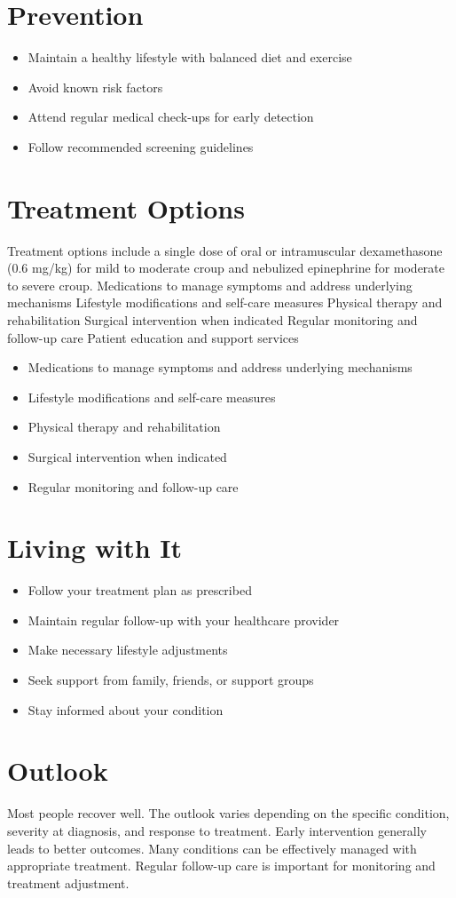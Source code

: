 \section{Prevention}
\begin{itemize}[noitemsep]
  \item Maintain a healthy lifestyle with balanced diet and exercise
  \item Avoid known risk factors
  \item Attend regular medical check-ups for early detection
  \item Follow recommended screening guidelines
\end{itemize}
\section{Treatment Options}
Treatment options include a single dose of oral or intramuscular dexamethasone (0.6 mg/kg) for mild to moderate croup and nebulized epinephrine for moderate to severe croup. Medications to manage symptoms and address underlying mechanisms Lifestyle modifications and self-care measures Physical therapy and rehabilitation Surgical intervention when indicated Regular monitoring and follow-up care Patient education and support services

\begin{itemize}[noitemsep]
  \item Medications to manage symptoms and address underlying mechanisms
  \item Lifestyle modifications and self-care measures
  \item Physical therapy and rehabilitation
  \item Surgical intervention when indicated
  \item Regular monitoring and follow-up care
\end{itemize}
\section{Living with It}
\begin{itemize}[noitemsep]
  \item Follow your treatment plan as prescribed
  \item Maintain regular follow-up with your healthcare provider
  \item Make necessary lifestyle adjustments
  \item Seek support from family, friends, or support groups
  \item Stay informed about your condition
\end{itemize}
\section{Outlook}
Most people recover well. The outlook varies depending on the specific condition, severity at diagnosis, and response to treatment. Early intervention generally leads to better outcomes. Many conditions can be effectively managed with appropriate treatment. Regular follow-up care is important for monitoring and treatment adjustment.
